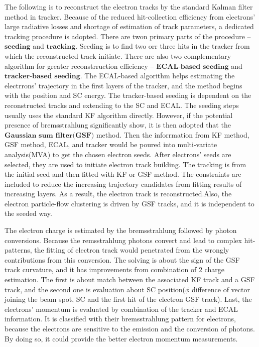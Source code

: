 			The following is to reconstruct the electron tracks by the standard Kalman filter method in tracker. Because of the reduced hit-collection efficiency from electrons' large radiative losses and shortage of estimation of track parameters, a dedicated tracking procedure is adopted. There are twon primary parts of the procedure -- $\textbf{seeding}$ and $\textbf{tracking}$. Seeding is to find two orr three hits in the tracker from which the reconstructed track initiate. There are also two complementary algorithm for greater reconstrruction efficiency -- $\textbf{ECAL-based}$ $\textbf{seeding}$ and $\textbf{tracker-based}$ $\textbf{seeding}$. The ECAL-based algorithm helps estimating the electrrons' trajectory in the first layers of the tracker, and the method begins with the position and SC energy. The tracker-based seeding is dependent on the reconstructed tracks and extending to the SC and ECAL. The seeding steps usually uses the standard KF algorithm directly. However, if the potential presence of bremsstrahlung significantly show, it is then adopted that the $\textbf{Gaussian}$ $\textbf{sum}$ $\textbf{filter}$$\textbf{(GSF)}$ method. Then the inforrmation from KF method, GSF method, ECAL, and tracker would be poured into multi-variate analysis(MVA) to get the chosen electron seeds. After electrons' seeds are selected, they are used to initiate electron track building. The tracking is from the initial seed and then fitted with KF or GSF method. The constraints are included to reduce the increasing trajectory candidates from fitting results of increasing layers. As a result, the electron track is reconstructed.Also, the electron particle-flow clustering is driven by GSF tracks, and it is independent to the seeded way.

			The electron charge is estimated by the bremsstrahlung followed by photon conversions. Because the remsstrahlung photons convert and lead to complex hit-patterns, the fitting of electron track would penetrated from the wrongly contributions from this conversion. The solving is about the sign of the GSF track curvature, and it has improvements from combination of 2 charge estimation. The first is about match between the associated KF track and a GSF track, and the second one is evaluation about SC position($\phi$ difference of vector joining the beam spot, SC and the first hit of the electron GSF track). Last, the electrons' momentum is evaluated by combination of the tracker and ECAL information. It is classified with their bremsstrahlung pattern for electrons, because the electrons are sensitive to the emission and the conversion of photons. By doing so, it could provide the better electron momentum measurements.

